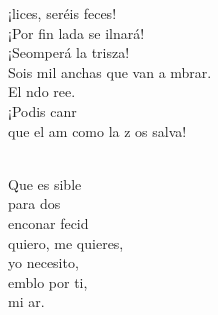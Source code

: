 \documentclass[12pt]{article}
\begin{document}
\begin{multicols*}{2}
\begin{cancion}
            \begin{chorus}%
            ¡lices, seréis feces! \\
            ¡Por fin lada se ilnará!\\
            ¡Seomperá la trisza!\\
            Sois mil anchas que van a mbrar.\\
            El ndo ree.\\
            ¡Podis canr\\
            que el am como la z os salva!\\
            \end{chorus}%
            \jump\\
            Que es sible\\
            para dos \\
            enconar fecid\\
            quiero, me quieres,\\
            yo  necesito,\\
            emblo por ti,\\
            mi ar.\\
        \end{cancion}%
        

\end{multicols*}
\end{document}
